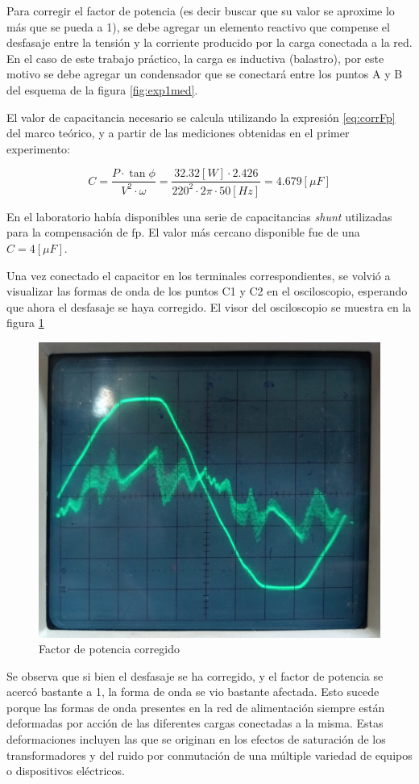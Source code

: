 Para corregir el factor de potencia (es decir buscar que su valor se aproxime lo más que se
pueda a 1), se debe agregar un elemento reactivo que compense el desfasaje entre la
tensión y la corriente producido por la carga conectada a la red. En el caso de este trabajo práctico, la carga es inductiva (balastro), por este motivo se debe agregar un condensador que se conectará entre los puntos A y B del esquema de la figura \ref{fig:exp1med}.

El valor de capacitancia necesario se calcula utilizando la expresión \ref{eq:corrFp} del marco teórico, y a partir de las mediciones obtenidas en el primer experimento:

\begin{equation*}
    C=\frac{P\cdot \tan\phi}{V^2\cdot \omega}=\frac{32.32[W]\cdot 2.426}{220^2 \cdot 2\pi \cdot50 [Hz]} = 4.679 [\mu F]
\end{equation*}


En el laboratorio había disponibles una serie de capacitancias \textit{shunt} utilizadas para la compensación de $\mathrm{fp}$. El valor más cercano disponible fue de una $C=4 [\mu F]$. 

Una vez conectado el capacitor en los terminales correspondientes, se volvió a visualizar las formas de onda de los puntos C1 y C2 en el osciloscopio, esperando que ahora el desfasaje se haya corregido. El visor del osciloscopio se muestra en la figura \ref{fig:corrFp}

\begin{figure}[H]
    \centering
    \includegraphics[width=0.6\linewidth]{Imagenes/Mediciones/corrFp.jpeg}
    \caption{Factor de potencia corregido}
    \label{fig:corrFp}
\end{figure}

Se observa que si bien el desfasaje se ha corregido, y el factor de potencia se acercó bastante a 1, la forma de onda se vio bastante afectada. Esto sucede porque las formas de onda presentes en
la red de alimentación siempre están deformadas por acción de las diferentes cargas
conectadas a la misma.
Estas deformaciones incluyen las que se originan en los efectos de saturación de los
transformadores y del ruido por conmutación de una múltiple variedad de equipos o dispositivos eléctricos. 

